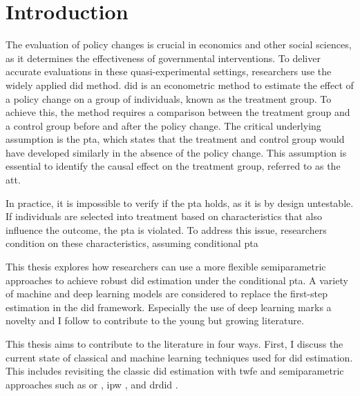 \section{Introduction}



The evaluation of policy changes is crucial in economics and other social sciences, as it determines the effectiveness of governmental interventions.
To deliver accurate evaluations in these quasi-experimental settings, researchers use the widely applied \ac{did} method.
\ac{did} is an econometric method to estimate the effect of a policy change on a group of individuals, known as the treatment group.
To achieve this, the method requires a comparison between the treatment group and a control group before and after the policy change.
The critical underlying assumption is the \ac{pta}, which states that the treatment and control group would have developed similarly in the absence of the policy change.
This assumption is essential to identify the causal effect on the treatment group, referred to as the \ac{att}.

In practice, it is impossible to verify if the \ac{pta} holds, as it is by design untestable.
If individuals are selected into treatment based on characteristics that also influence the outcome, the \ac{pta} is violated.
To address  this issue, researchers condition on these characteristics, assuming conditional \ac{pta} \citep[see][]{santannaDoublyRobustDifferenceindifferences2020,manfeDifferenceInDifferenceDesignRepeated}

This thesis explores how researchers can use a more flexible semiparametric approaches to achieve robust \ac{did} estimation under the conditional \ac{pta}.
A variety of machine and deep learning models are considered to replace the first-step estimation in the \ac{did} framework.
Especially the use of deep learning marks a novelty and I follow \citet{farrellDeepNeuralNetworks2021} to contribute to the young but growing literature.



%
This thesis aims to contribute to the literature in four ways.
First, I discuss the current state of classical and machine learning techniques used for \ac{did} estimation.
This includes revisiting the classic \ac{did} estimation with \ac{twfe} and semiparametric approaches such as \ac{or} \citep[see][]{heckmanMatchingEconometricEvaluation1998}, \ac{ipw} \citep[see][]{abadieSemiparametricDifferenceinDifferencesEstimators2005}, and \ac{drdid} \citep[see][]{santannaDoublyRobustDifferenceindifferences2020}.

